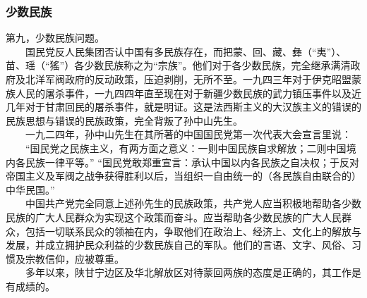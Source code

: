 \documentclass[cn,11pt,chinese]{elegantbook}
\def\myformat#1{\hfil\hfil #1}
\begin{document}
\subsubsection*{\myformat{少数民族}}
第九，少数民族问题。\\
　　国民党反人民集团否认中国有多民族存在，而把蒙、回、藏、彝（“夷”）、苗、瑶（“猺”）各少数民族称之为“宗族”。他们对于各少数民族，完全继承满清政府及北洋军阀政府的反动政策，压迫剥削，无所不至。一九四三年对于伊克昭盟蒙族人民的屠杀事件，一九四四年直至现在对于新疆少数民族的武力镇压事件以及近几年对于甘肃回民的屠杀事件，就是明证。这是法西斯主义的大汉族主义的错误的民族思想与错误的民族政策，完全背叛了孙中山先生。\\
　　一九二四年，孙中山先生在其所著的中国国民党第一次代表大会宣言里说：\\
　　“国民党之民族主义，有两方面之意义：一则中国民族自求解放；二则中国境内各民族一律平等。” “国民党敢郑重宣言：承认中国以内各民族之自决权；于反对帝国主义及军阀之战争获得胜利以后，当组织一自由统一的（各民族自由联合的）中华民国。”\\
　　中国共产党完全同意上述孙先生的民族政策，共产党人应当积极地帮助各少数民族的广大人民群众为实现这个政策而奋斗。应当帮助各少数民族的广大人民群众，包括一切联系民众的领袖在内，争取他们在政治上、经济上、文化上的解放与发展，并成立拥护民众利益的少数民族自己的军队。他们的言语、文字、风俗、习惯及宗教信仰，应被尊重。\\
　　多年以来，陕甘宁边区及华北解放区对待蒙回两族的态度是正确的，其工作是有成绩的。\\
\end{document}

